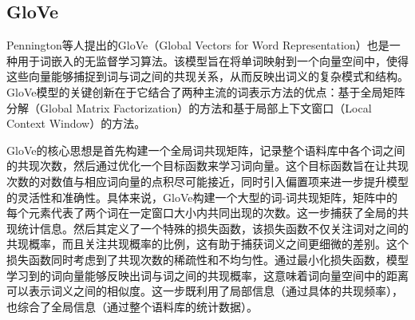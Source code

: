 \subsection[\hspace{-2pt}GloVe]{{\heiti{} \hspace{-8pt}GloVe}}\label{section2: GloVe}

Pennington等人\cite{GloVe}提出的GloVe（Global Vectors for Word Representation）也是一种用于词嵌入的无监督学习算法。该模型旨在将单词映射到一个向量空间中，使得这些向量能够捕捉到词与词之间的共现关系，从而反映出词义的复杂模式和结构。GloVe模型的关键创新在于它结合了两种主流的词表示方法的优点：基于全局矩阵分解（Global Matrix Factorization）的方法和基于局部上下文窗口（Local Context Window）的方法。

GloVe的核心思想是首先构建一个全局词共现矩阵，记录整个语料库中各个词之间的共现次数，然后通过优化一个目标函数来学习词向量。这个目标函数旨在让共现次数的对数值与相应词向量的点积尽可能接近，同时引入偏置项来进一步提升模型的灵活性和准确性。具体来说，GloVe构建一个大型的词-词共现矩阵，矩阵中的每个元素代表了两个词在一定窗口大小内共同出现的次数。这一步捕获了全局的共现统计信息。然后其定义了一个特殊的损失函数，该损失函数不仅关注词对之间的共现概率，而且关注共现概率的比例，这有助于捕获词义之间更细微的差别。这个损失函数同时考虑到了共现次数的稀疏性和不均匀性。通过最小化损失函数，模型学习到的词向量能够反映出词与词之间的共现概率，这意味着词向量空间中的距离可以表示词义之间的相似度。这一步既利用了局部信息（通过具体的共现频率），也综合了全局信息（通过整个语料库的统计数据）。

